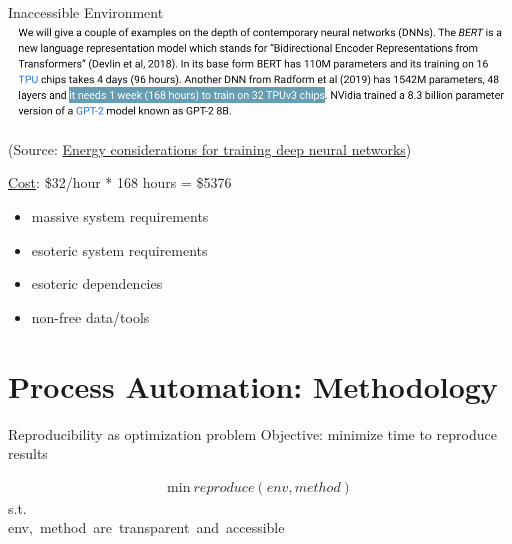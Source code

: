 \documentclass{beamer}
\begin{document}
\begin{frame}{Inaccessible Environment}
\includegraphics[width=\linewidth]{images/dl_training}

\tiny
(Source: \href{https://ekamperi.github.io/machine\%20learning/2019/08/14/energy-considerations-dnn.html}{Energy considerations for training deep neural networks})

\normalsize
\href{https://cloud.google.com/tpu/pricing}{Cost}: \$32/hour * 168 hours = \$5376

\begin{itemize}
\item massive system requirements
\item esoteric system requirements
\item esoteric dependencies
\item non-free data/tools
\end{itemize}

\end{frame}





\section{Process Automation: Methodology}

\begin{frame}{Reproducibility as optimization problem}
Objective: minimize time to reproduce results

\begin{align}
\mbox{min} ~ reproduce(env, method)
\end{align}
s.t.\\ \mbox{env, method are transparent and accessible}

\end{frame}
\end{document}
